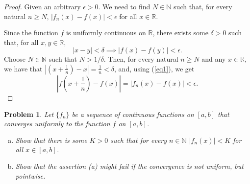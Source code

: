 \documentclass[11pt]{article}
\theoremstyle{plain}
\newtheorem{problem}{Problem}
\theoremstyle{remark}
\newcommand {\mbR} {\mathbb R}
\newcommand {\mbN} {\mathbb N}
\begin{document}
\begin{proof}
	Given an arbitrary $\epsilon >0$. We need to find $N \in \mbN$ such that, for every natural $n \geq N$, 
	$|f_n(x)-f(x)|<\epsilon$ for all $x \in \mbR$. 
	
	Since the function $f$ is uniformly continuous on $\mbR$, there exists some $\delta>0$ such that, 
	for all $x,y \in \mbR$, 
	\begin{equation}
	\label{eq1}
	|x-y|<\delta \implies |f(x)-f(y)|<\epsilon.
	\end{equation}
	Choose $N \in \mbN$ such that $N > 1/\delta$. Then, for every natural 
	$n \geq N$ and any $x \in \mbR$, we have that 
	$|\left( x+\frac{1}{n}\right) -x| = \frac{1}{n}<\delta$, and, using
	(\ref{eq1}), we get
	$$
	|f(x+\frac{1}{n}) - f(x)| = |f_n(x) - f(x)|<\epsilon.
	$$
\end{proof}

\begin{problem}
	Let $\{f_n\}$ be a sequence of continuous functions on $[a,b]$ that converges uniformly to the function $f$ on $[a,b]$. 
	\begin{enumerate}[(a)]
		\item Show that there is some $K >0$ such that  for every $n \in \mbN$ $|f_n(x)| < K$ for all $x \in [a,b]$.
		\item Show that the assertion (a) might fail if the convergence is not uniform, but pointwise.
	\end{enumerate}
\end{problem}
\end{document}
